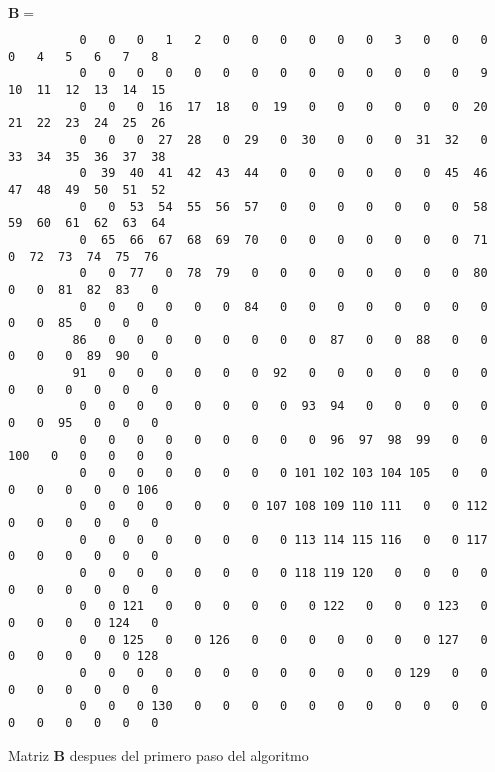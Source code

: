\begin{listado}                                                                                
$\mathbf{B} = $                                                                                
\tiny                                                                                          
\begin{verbatim}                                                                               
          0   0   0   1   2   0   0   0   0   0   0   3   0   0   0   0   4   5   6   7   8
          0   0   0   0   0   0   0   0   0   0   0   0   0   0   9  10  11  12  13  14  15
          0   0   0  16  17  18   0  19   0   0   0   0   0   0  20  21  22  23  24  25  26
          0   0   0  27  28   0  29   0  30   0   0   0  31  32   0  33  34  35  36  37  38
          0  39  40  41  42  43  44   0   0   0   0   0   0  45  46  47  48  49  50  51  52
          0   0  53  54  55  56  57   0   0   0   0   0   0   0  58  59  60  61  62  63  64
          0  65  66  67  68  69  70   0   0   0   0   0   0   0  71   0  72  73  74  75  76
          0   0  77   0  78  79   0   0   0   0   0   0   0   0  80   0   0  81  82  83   0
          0   0   0   0   0   0  84   0   0   0   0   0   0   0   0   0   0  85   0   0   0
         86   0   0   0   0   0   0   0   0  87   0   0  88   0   0   0   0   0  89  90   0
         91   0   0   0   0   0   0  92   0   0   0   0   0   0   0   0   0   0   0   0   0
          0   0   0   0   0   0   0   0  93  94   0   0   0   0   0   0   0  95   0   0   0
          0   0   0   0   0   0   0   0   0  96  97  98  99   0   0 100   0   0   0   0   0
          0   0   0   0   0   0   0   0 101 102 103 104 105   0   0   0   0   0   0   0 106
          0   0   0   0   0   0   0 107 108 109 110 111   0   0 112   0   0   0   0   0   0
          0   0   0   0   0   0   0   0 113 114 115 116   0   0 117   0   0   0   0   0   0
          0   0   0   0   0   0   0   0 118 119 120   0   0   0   0   0   0   0   0   0   0
          0   0 121   0   0   0   0   0   0 122   0   0   0 123   0   0   0   0   0 124   0
          0   0 125   0   0 126   0   0   0   0   0   0   0 127   0   0   0   0   0   0 128
          0   0   0   0   0   0   0   0   0   0   0   0 129   0   0   0   0   0   0   0   0
          0   0   0 130   0   0   0   0   0   0   0   0   0   0   0   0   0   0   0   0   0
\end{verbatim}                                                                                 
\caption{Matriz $\mathbf{B}$ despues del primero paso del algoritmo}                                              
\label{lis:arrayb}                                                                             
\end{listado}                                                                                  
                                                                                               
